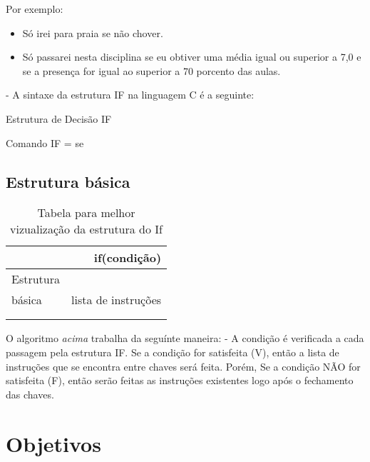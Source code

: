 \documentclass[a4paper,10pt]{article}  %
\begin{document}
Por exemplo:
\begin{itemize}
               
               \item  Só irei para praia se não chover. 
               \item  Só passarei nesta disciplina se eu obtiver uma média igual ou superior a 7,0 e se a presença for igual ao superior a 70 porcento das aulas.
             
\end{itemize}

 - A sintaxe da estrutura IF na linguagem C é a seguinte:
 
       Estrutura de Decisão IF

Comando IF = se


\subsection{Estrutura básica}	       

\begin{table}
\begin{center}
 \caption{Tabela para melhor vizualização da estrutura do If}
\begin{tabular}{|l|r|}
  \hline \hline
  
             & if(condição) \\ \hline
  Estrutura  &  {  \\ \hline
   básica    &   lista de instruções  \\ \hline
             &  }  \\ \hline
             & \\  \hline
\end{tabular}
\label{tab:resultados}
\end{center}
\end{table}

 O algoritmo \textit{acima} trabalha da seguínte maneira:
 - A condição é verificada a cada passagem pela estrutura IF. Se a condição for satisfeita (V), 
 então a lista de instruções que se encontra entre chaves será feita. 
 Porém, Se a condição NÃO for satisfeita (F), então serão feitas as instruções existentes logo após o fechamento das chaves.


\section{Objetivos}
\end{document}
